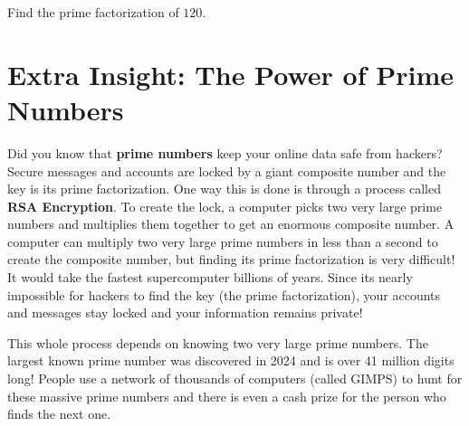 \documentclass{ximera}[font=12pt]  %
\begin{document}
\begin{problem}
  Find the prime factorization of $120.$

  \begin{multipleChoice}
  \end{multipleChoice}


\end{problem}

\section*{Extra Insight:  The Power of Prime Numbers}

Did you know that \textbf{prime numbers} keep your online data safe from hackers?  Secure messages and accounts are locked by 
a giant composite number and the key is its prime factorization.  One way this is done is through a process called \textbf{RSA Encryption}.  
To create the lock, a computer picks two very large prime numbers and multiplies them together to get an enormous composite number.  
A computer can multiply two very large prime numbers in less than a second to create the composite number, but finding its prime 
factorization is very difficult!  It would take the fastest supercomputer billions of years.  Since its nearly impossible for hackers 
to find the key (the prime factorization), your accounts and messages stay locked and your information remains private!

This whole process depends on knowing two very large prime numbers. The largest known prime number was discovered in 2024 and is 
over 41 million digits long! People use a network of thousands of computers (called GIMPS) to hunt for these massive prime numbers 
and there is even a cash prize for the person who finds the next one.
\end{document}
